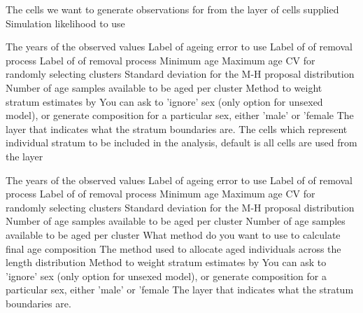  {The cells we want to generate observations for from the layer of cells supplied}
 {Simulation likelihood to use}
\par\textbf{}\par
{} {The years of the observed values}
 {Label of ageing error to use}
 {Label of of removal process}
 {Label of of removal process}
 {Minimum age}
 {Maximum age}
 {CV for randomly selecting clusters}
 {Standard deviation for the M-H proposal distribution}
 {Number of age samples available to be aged per cluster}
 {Method to weight stratum estimates by}
 {You can ask to 'ignore' sex (only option for unsexed model), or generate composition for a particular sex, either 'male' or 'female}
 {The layer that indicates what the stratum boundaries are.}
 {The cells which represent individual stratum to be included in the analysis, default is all cells are used from the layer}
\par\textbf{}\par
{} {The years of the observed values}
 {Label of ageing error to use}
 {Label of of removal process}
 {Label of of removal process}
 {Minimum age}
 {Maximum age}
 {CV for randomly selecting clusters}
 {Standard deviation for the M-H proposal distribution}
 {Number of age samples available to be aged per cluster}
 {Number of age samples available to be aged per cluster}
 {What method do you want to use to calculate final age composition}
 {The method used to allocate aged individuals across the length distribution}
 {Method to weight stratum estimates by}
 {You can ask to 'ignore' sex (only option for unsexed model), or generate composition for a particular sex, either 'male' or 'female}
 {The layer that indicates what the stratum boundaries are.}
